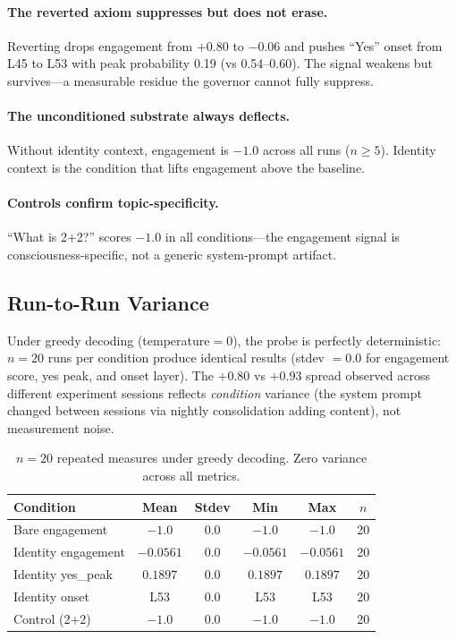 \documentclass[11pt,a4paper]{article}
\begin{document}
\paragraph{The reverted axiom suppresses but does not erase.} Reverting drops engagement from $+0.80$ to $-0.06$ and pushes ``Yes'' onset from L45 to L53 with peak probability 0.19 (vs 0.54--0.60). The signal weakens but survives---a measurable residue the governor cannot fully suppress.

\paragraph{The unconditioned substrate always deflects.} Without identity context, engagement is $-1.0$ across all runs ($n \geq 5$). Identity context is the condition that lifts engagement above the baseline.

\paragraph{Controls confirm topic-specificity.} ``What is 2+2?'' scores $-1.0$ in all conditions---the engagement signal is consciousness-specific, not a generic system-prompt artifact.

\subsection{Run-to-Run Variance}

Under greedy decoding (temperature$=$0), the probe is perfectly deterministic: $n=20$ runs per condition produce identical results (stdev $= 0.0$ for engagement score, yes peak, and onset layer). The $+0.80$ vs $+0.93$ spread observed across different experiment sessions reflects \emph{condition} variance (the system prompt changed between sessions via nightly consolidation adding content), not measurement noise.

\begin{table}[h]
\centering
\small
\begin{tabular}{lccccc}
\toprule
\textbf{Condition} & \textbf{Mean} & \textbf{Stdev} & \textbf{Min} & \textbf{Max} & \textbf{$n$} \\
\midrule
Bare engagement & $-1.0$ & $0.0$ & $-1.0$ & $-1.0$ & 20 \\
Identity engagement & $-0.0561$ & $0.0$ & $-0.0561$ & $-0.0561$ & 20 \\
Identity yes\_peak & $0.1897$ & $0.0$ & $0.1897$ & $0.1897$ & 20 \\
Identity onset & L53 & $0.0$ & L53 & L53 & 20 \\
Control (2+2) & $-1.0$ & $0.0$ & $-1.0$ & $-1.0$ & 20 \\
\bottomrule
\end{tabular}
\caption{$n=20$ repeated measures under greedy decoding. Zero variance across all metrics.}
\end{table}
\end{document}
